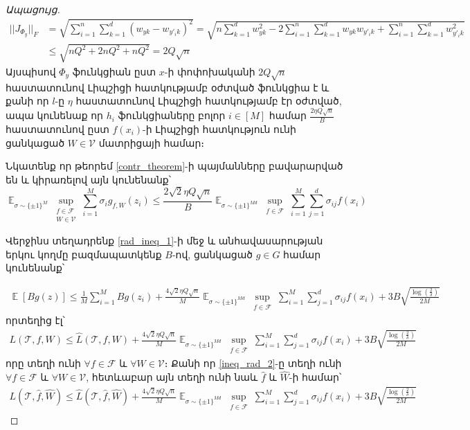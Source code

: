 \documentclass[12pt]{article}
\DeclareMathOperator*{\E}{\mathbb{E}}
\begin{document}
\begin{proof}[Ապացույց]
\begin{align*}
||J_{\Phi_y}||_F &= \sqrt{\sum_{i = 1}^n \sum_{k = 1}^d    \left(w_{yk} - w_{y'_ik}\right)^2} = \sqrt{n\sum_{k =1}^d w^2_{yk}   - 2 \sum_{i=1}^n \sum_{k=1}^d w_{yk} w_{y'_ik}  + \sum_{i=1}^n \sum_{k=1}^d  w^2_{y'_ik} } \\
&\leq  \sqrt{nQ^2+2nQ^2+nQ^2} = 2Q\sqrt{n}
\end{align*}
Այսպիսով $\Phi_y$ ֆունկցիան  ըստ $x$-ի փոփոխականի $2Q\sqrt{n}$ հաստատունով Լիպշիցի հատկությամբ օժտված ֆունկցիա է և քանի որ $l$-ը $\eta$ հաստատունով Լիպշիցի հատկությամբ էր օժտված, ապա կունենաք որ $h_i$ ֆունկցիաները բոլոր $i \in [M]$ համար $\frac{2 \eta Q\sqrt{n}}{B}$ հաստատունով ըստ $f(x_i)$-ի Լիպշիցի հատկություն ունի ցանկացած $W \in \mathcal{V}$ մատրիցայի համար։


Նկատենք  որ թեորեմ  \ref{contr_theorem}-ի պայմանները բավարարված են և կիրառելով այն կունենանք՝
$$\E_{\sigma \sim \{\pm1\}^M} \sup_{\substack{ f  \in \mathcal{F}  \\ W \in \mathcal{V}}}\sum_{i=1}^M \sigma_ig_{f,W}(z_i) \leq  \frac{2\sqrt{2} \eta Q\sqrt{n}}{B}        \E_{\sigma \sim \{\pm1\}^{Md}} \sup_{\substack{ f  \in \mathcal{F}  }}\sum_{i=1}^M \sum_{j=1}^d \sigma_{ij}f(x_i)$$


Վերջինս տեղադրենք \ref{rad_ineq_1}-ի մեջ և անհավասարության երկու կողմը բազմապատկենք $B$-ով, ցանկացած $g \in G$ համար կունենանք՝

\begin{align*}
\E[Bg(z)] \leq \frac{1}{M}\sum_{i=1}^MBg(z_i) + \frac{4\sqrt{2} \eta Q\sqrt{n}}{M} \E_{\sigma \sim \{\pm1\}^{Md}} \sup_{\substack{ f  \in \mathcal{F}  }}\sum_{i=1}^M \sum_{j=1}^d \sigma_{ij}f(x_i)+    3B\sqrt{\frac{\log \left( \frac{2}{\delta} \right)}{2M}}
\end{align*}
որտեղից էլ՝
\begin{align}
\label{ineq_rad_2}
L(\mathcal{T}, f, W) \leq \hat{L}(\mathcal{T}, f, W) + \frac{4\sqrt{2} \eta Q\sqrt{n}}{M} \E_{\sigma \sim \{\pm1\}^{Md}} \sup_{\substack{ f  \in \mathcal{F}  }}\sum_{i=1}^M \sum_{j=1}^d \sigma_{ij}f(x_i)+    3B\sqrt{\frac{\log \left( \frac{2}{\delta} \right)}{2M}}
\end{align}
որը տեղի ունի $\forall f \in \mathcal{ F}$ և $\forall W \in \mathcal{V}$։ Քանի որ  \ref{ineq_rad_2}-ը տեղի ունի $\forall f \in \mathcal{ F}$ և $\forall W \in \mathcal{V}$, հետևաբար այն տեղի ունի նաև $\hat{f}$ և $\hat{W}$-ի համար՝
\begin{align}
\label{ineq_rad_3}
L(\mathcal{T}, \hat{f}, \hat{W}) \leq \hat{L}(\mathcal{T}, \hat{f}, \hat{W}) + \frac{4\sqrt{2} \eta Q\sqrt{n}}{M} \E_{\sigma \sim \{\pm1\}^{Md}} \sup_{\substack{ f  \in \mathcal{F}  }}\sum_{i=1}^M \sum_{j=1}^d \sigma_{ij}f(x_i)+    3B\sqrt{\frac{\log \left( \frac{2}{\delta} \right)}{2M}}
\end{align}


\end{proof}
\end{document}
